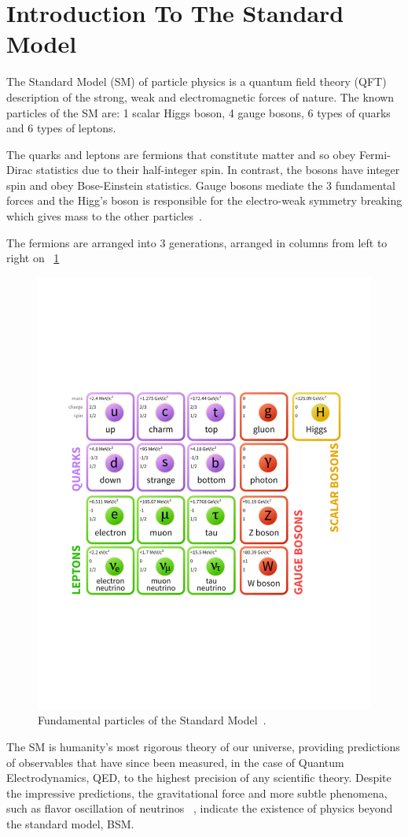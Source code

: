\section{Introduction To The Standard Model}\label{secSM}



The Standard Model (SM) of particle physics is a quantum field theory (QFT) description of the strong, weak and electromagnetic forces of nature. The known particles of the SM are: 1 scalar Higgs boson, 4 gauge bosons, 6 types of quarks and 6 types of leptons. 

The quarks and leptons are fermions that constitute matter and so obey Fermi-Dirac statistics due to their half-integer spin. In contrast, the bosons have integer spin and obey Bose-Einstein statistics. Gauge bosons mediate the 3 fundamental forces and the Higg's boson is responsible for the electro-weak symmetry breaking which gives mass to the other particles~\cite{Griffiths:111880}. 

The fermions are arranged into 3 generations, arranged in columns from left to right on ~\ref{fig:SM}

\begin{figure}[htb]
\centering
\includegraphics[width=.60\textwidth]{smdiagram.pdf}
\caption{Fundamental particles of the Standard Model~\cite{modellinginvisible}.}
\label{fig:SM}
\end{figure}




The SM is humanity's most rigorous theory of our universe, providing predictions of observables that have since been measured, in the case of Quantum Electrodynamics, QED, to the highest precision of any scientific theory. Despite the impressive predictions, the gravitational force and more subtle phenomena, such as flavor oscillation of neutrinos ~\cite{Ashie:2005ik}, indicate the existence of physics beyond the standard model, BSM.

